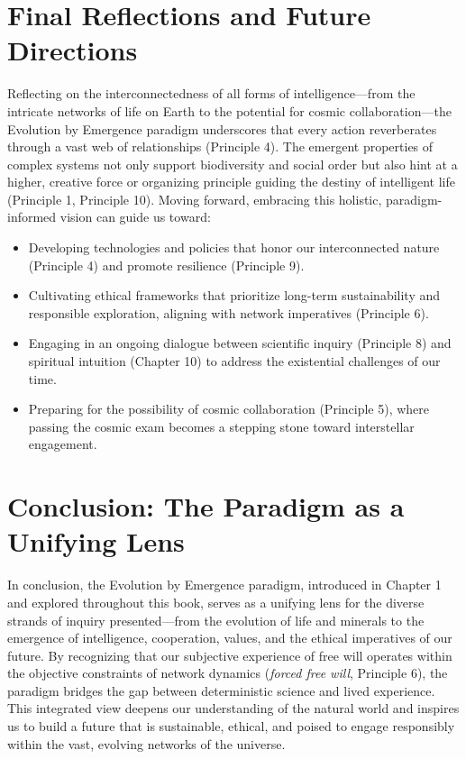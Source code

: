 \documentclass[12pt,openany]{book}
\let\cleardoublepage\clearpage %
\begin{document}
\section{Final Reflections and Future Directions}
Reflecting on the interconnectedness of all forms of intelligence—from the intricate networks of life on Earth to the potential for cosmic collaboration—the Evolution by Emergence paradigm underscores that every action reverberates through a vast web of relationships (Principle 4). The emergent properties of complex systems not only support biodiversity and social order but also hint at a higher, creative force or organizing principle guiding the destiny of intelligent life (Principle 1, Principle 10). Moving forward, embracing this holistic, paradigm-informed vision can guide us toward:
\begin{itemize}
    \item Developing technologies and policies that honor our interconnected nature (Principle 4) and promote resilience (Principle 9).
    \item Cultivating ethical frameworks that prioritize long-term sustainability and responsible exploration, aligning with network imperatives (Principle 6).
    \item Engaging in an ongoing dialogue between scientific inquiry (Principle 8) and spiritual intuition (Chapter 10) to address the existential challenges of our time.
    \item Preparing for the possibility of cosmic collaboration (Principle 5), where passing the cosmic exam becomes a stepping stone toward interstellar engagement.
\end{itemize} %

\section{Conclusion: The Paradigm as a Unifying Lens} %
In conclusion, the Evolution by Emergence paradigm, introduced in Chapter 1 and explored throughout this book, serves as a unifying lens for the diverse strands of inquiry presented—from the evolution of life and minerals to the emergence of intelligence, cooperation, values, and the ethical imperatives of our future. By recognizing that our subjective experience of free will operates within the objective constraints of network dynamics (\emph{forced free will}, Principle 6), the paradigm bridges the gap between deterministic science and lived experience. This integrated view deepens our understanding of the natural world and inspires us to build a future that is sustainable, ethical, and poised to engage responsibly within the vast, evolving networks of the universe. %
\cleardoublepage
\end{document}
